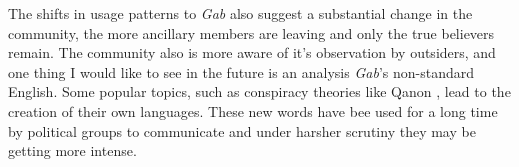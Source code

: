\documentclass[letterpaper]{article}
\begin{document}
The shifts in usage patterns to \textit{Gab} also suggest a substantial change in the community, the more ancillary members are leaving and only the true believers remain. The community also is more aware of it's observation by outsiders, and one thing I would like to see in the future is an analysis \textit{Gab}'s non-standard English. Some popular topics, such as conspiracy theories like Qanon \cite{qan}, lead to the creation of their own languages. These new words have bee used for a long time by political groups to communicate \cite{lopez2015dog} and under harsher scrutiny they may be getting more intense.



\end{document}
